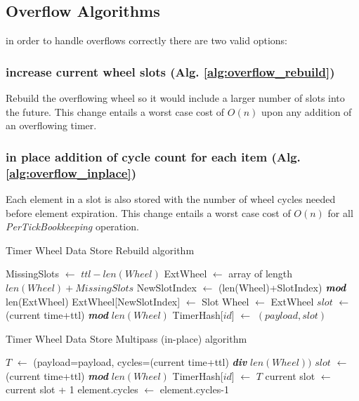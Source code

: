 \documentclass[conference]{IEEEtran}
\newcommand*\Let[2]{\State #1 $\gets$ #2}
\begin{document}
\subsection{Overflow Algorithms}
in order to handle overflows correctly there are two valid options:
\subsubsection{increase current wheel slots (Alg. \ref{alg:overflow_rebuild})} Rebuild the overflowing wheel so it would include a larger number of slots into the future. This change entails a worst case cost of $O(n)$ upon any addition of an overflowing timer.
\subsubsection{in place addition of cycle count for each item (Alg. \ref{alg:overflow_inplace})} Each element in a slot is also stored with the number of wheel cycles needed before element expiration. This change entails a worst case cost of $O(n)$ for all \textit{PerTickBookkeeping} operation.


\begin{algorithm}
	\caption{Timer Wheel Data Store Rebuild algorithm\label{alg:overflow_rebuild}}
	\begin{algorithmic}[1]
			\Let{MissingSlots}{$ttl-len(Wheel)$}
			\Let{ExtWheel}{array of length $len(Wheel) + MissingSlots$}
				\Let{NewSlotIndex}{(len(Wheel)+SlotIndex) $\textit{\textbf{mod}}$ len(ExtWheel) }
				\Let{ExtWheel[NewSlotIndex]}{Slot}
			\EndFor
			\Let{Wheel}{ExtWheel}
		\EndIf
		\Let{$slot$}{(current time+ttl) \textit{\textbf{mod}} $len(Wheel)$}
		\Let{TimerHash[$id$]}{$(payload,slot)$}
		\EndFunction
	\end{algorithmic}
\end{algorithm}


\begin{algorithm}
	\caption{Timer Wheel Data Store Multipass (in-place) algorithm\label{alg:overflow_inplace}}
	\begin{algorithmic}[1]
		\Statex
		\Let{$T$}{(payload=payload, cycles=(current time+ttl) \textit{\textbf{div}} $len(Wheel))$}
		\Let{$slot$}{(current time+ttl) \textit{\textbf{mod}} $len(Wheel)$}
		\Let{TimerHash[$id$]}{$T$}
		\EndFunction
		\Statex
		\Let{current slot}{current slot + 1} 
			\Let{element.cycles}{element.cycles-1}
			\EndIf
		\EndFor
		\EndFunction
	\end{algorithmic}
\end{algorithm}
\end{document}
